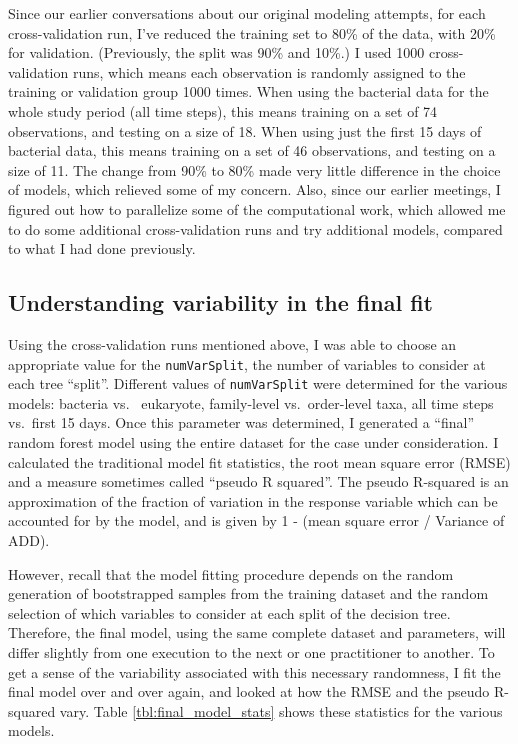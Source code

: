 \documentclass{article}
\begin{document}
Since our earlier conversations about our original modeling attempts,
for each cross-validation run, I've reduced the training set to 80\%
of the data, with 20\% for validation.  (Previously, the split was
90\% and 10\%.)  I used 1000 cross-validation runs, which means each
observation is randomly assigned to the training or validation group
1000 times.  When using the bacterial data for the whole study period
(all time steps), this means training on a set of 74 observations, and
testing on a size of 18.  When using just the first 15 days of
bacterial data, this means training on a set of 46 observations, and
testing on a size of 11.  The change from 90\% to 80\% made very
little difference in the choice of models, which relieved some of my
concern.  Also, since our earlier meetings, I figured out how to
parallelize some of the computational work, which allowed me to do
some additional cross-validation runs and try additional models,
compared to what I had done previously.


\subsection{Understanding variability in the final fit}

Using the cross-validation runs mentioned above, I was able to choose
an appropriate value for the \texttt{numVarSplit}, the number of
variables to consider at each tree ``split''.  Different values of
\texttt{numVarSplit} were determined for the various models: bacteria
vs.~ eukaryote, family-level vs.~order-level taxa, all time steps
vs.~first 15 days.  Once this parameter was determined, I generated a
``final'' random forest model using the entire dataset for the case
under consideration.  I calculated the traditional model fit
statistics, the root mean square error (RMSE) and a measure sometimes
called ``pseudo R squared''.  The pseudo R-squared is an approximation
of the fraction of variation in the response variable which can be
accounted for by the model, and is given by 1 - (mean square error /
Variance of ADD).

However, recall that the model fitting procedure depends on the random
generation of bootstrapped samples from the training dataset and the
random selection of which variables to consider at each split of the
decision tree.  Therefore, the final model, using the same complete
dataset and parameters, will differ slightly from one execution to the
next or one practitioner to another.  To get a sense of the
variability associated with this necessary randomness, I fit the final
model over and over again, and looked at how the RMSE and the pseudo
R-squared vary.  Table \ref{tbl:final_model_stats} shows
these statistics for the various models.
\end{document}
